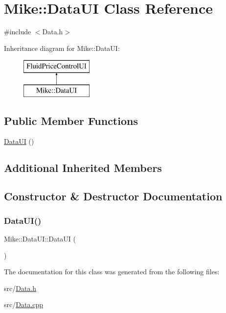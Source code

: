 \hypertarget{class_mike_1_1_data_u_i}{}\section{Mike\+:\+:Data\+UI Class Reference}
\label{class_mike_1_1_data_u_i}


{\ttfamily \#include $<$Data.\+h$>$}

Inheritance diagram for Mike\+:\+:Data\+UI\+:\begin{figure}[H]
\begin{center}
\leavevmode
\includegraphics[height=2.000000cm]{class_mike_1_1_data_u_i}
\end{center}
\end{figure}
\subsection*{Public Member Functions}
\begin{DoxyCompactItemize}
\item 
\hyperlink{class_mike_1_1_data_u_i_ad2bc91f28168c7cc8bbcca47b54e59e8}{Data\+UI} ()
\end{DoxyCompactItemize}
\subsection*{Additional Inherited Members}


\subsection{Constructor \& Destructor Documentation}
\mbox{\label{class_mike_1_1_data_u_i_ad2bc91f28168c7cc8bbcca47b54e59e8}} 
\subsubsection{\texorpdfstring{Data\+U\+I()}{DataUI()}}
{\footnotesize\ttfamily Mike\+::\+Data\+U\+I\+::\+Data\+UI (\begin{DoxyParamCaption}{ }\end{DoxyParamCaption})}



The documentation for this class was generated from the following files\+:\begin{DoxyCompactItemize}
\item 
src/\hyperlink{_data_8h}{Data.\+h}\item 
src/\hyperlink{_data_8cpp}{Data.\+cpp}\end{DoxyCompactItemize}

